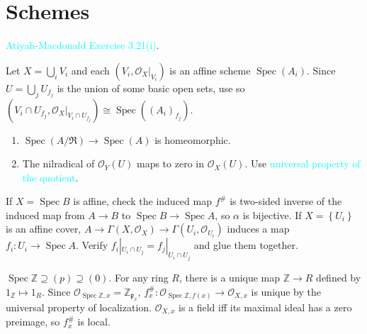 \section{Schemes}

\begin{exercise}\label{ex2.1}
	\textcolor{cyan}{Atiyah-Macdonald Exercise 3.21(i)}.
\end{exercise}

\begin{exercise}\label{ex2.2}
	Let $X=\bigcup_iV_i$ and each $\left(V_i,\mathcal{O}_X|_{V_i}\right)$ is an affine scheme $\operatorname{Spec}\!\left(A_i\right)$. Since $U=\bigcup_jU_{f_j}$ is the union of some basic open sets, use  so $\left(V_i\cap U_{f_j},\mathcal{O}_X|_{V_i\cap U_{f_j}}\right)\cong\operatorname{Spec}\!\left(\left(A_i\right)_{f_j}\right)$.
\end{exercise}

\begin{exercise}\label{ex2.3}
	\begin{enumerate}[label=(\alph*),ref=\theexercise(\alph*)]
		\addtocounter{enumi}{1}
		\item $\operatorname{Spec}(A/\mathfrak{R})\rightarrow\operatorname{Spec}(A)$ is homeomorphic.
		\item The nilradical of $\mathcal{O}_Y(U)$ maps to zero in $\mathcal{O}_X(U)$. Use \textcolor{cyan}{universal property of the quotient}.
	\end{enumerate}
\end{exercise}

\begin{exercise}\label{ex2.4}
	If $X=\operatorname{Spec}B$ is affine, check the induced map $f^\#$ is two-sided inverse of the induced map from $A\rightarrow B$ to $\operatorname{Spec}B\rightarrow\operatorname{Spec}A$, so $\alpha$ is bijective. If $X=\left\{U_i\right\}$ is an affine cover, $A\rightarrow\Gamma\!\left(X,\mathcal{O}_X\right)\rightarrow\Gamma\!\left(U_i,\mathcal{O}_{U_i}\right)$ induces a map $f_i:U_i\rightarrow\operatorname{Spec}A$. Verify $f_i|_{U_i\cap U_j}=f_j|_{U_i\cap U_j}$ and glue them together.
\end{exercise}

\begin{exercise}\label{ex2.5}
	$\operatorname{Spec}\mathbb{Z}\supseteq(p)\supseteq(0)$. For any ring $R$, there is a unique map $\mathbb{Z}\rightarrow R$ defined by $1_\mathbb{Z}\mapsto1_R$. Since $\mathcal{O}_{\operatorname{Spec}\mathbb{Z},x}=\mathbb{Z}_{\mathfrak{p}_x}$, $f^\#_x:\mathcal{O}_{\operatorname{Spec}\mathbb{Z},f(x)}\rightarrow\mathcal{O}_{X,x}$ is unique by the universal property of localization. $\mathcal{O}_{X,x}$ is a field iff its maximal ideal has a zero preimage, so $f^\#_x$ is local.
\end{exercise}

